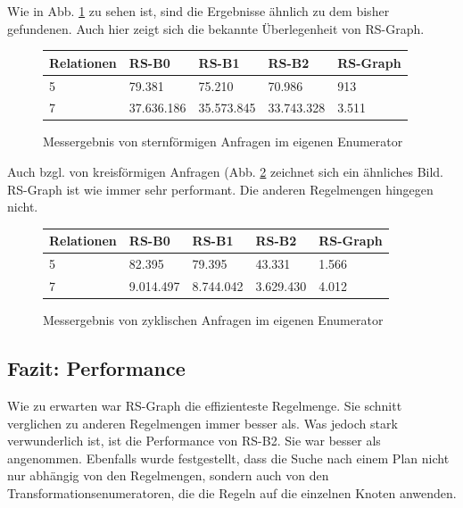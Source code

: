 Wie in Abb. \ref{starQuery123} zu sehen ist, sind die Ergebnisse ähnlich zu dem bisher gefundenen. Auch hier zeigt sich die bekannte Überlegenheit von RS-Graph. 


\begin{figure}[ht]
\centering
\begin{tabular}{|l|l|l|l|l|}
\hline
{\bf Relationen} & {\bf RS-B0} & {\bf RS-B1} & {\bf RS-B2} & {\bf RS-Graph} \\ \hline
5                & 79.381      & 75.210      & 70.986      & 913            \\ \hline
7                & 37.636.186  & 35.573.845  & 33.743.328  & 3.511          \\ \hline
\end{tabular}
  \caption{Messergebnis von sternförmigen Anfragen im eigenen Enumerator}
  \label{starQuery123}
\end{figure}


Auch bzgl. von kreisförmigen Anfragen (Abb. \ref{circle1} zeichnet sich ein ähnliches Bild. RS-Graph ist wie immer sehr performant. Die anderen Regelmengen hingegen nicht.



\begin{figure}[ht]
\centering
\begin{tabular}{|l|l|l|l|l|}
\hline
{\bf Relationen} & {\bf RS-B0} & {\bf RS-B1} & {\bf RS-B2} & {\bf RS-Graph} \\ \hline
5                & 82.395      & 79.395      & 43.331      & 1.566            \\ \hline
7                & 9.014.497  & 8.744.042  & 3.629.430  & 4.012          \\ \hline
\end{tabular}
  \caption{Messergebnis von zyklischen Anfragen im eigenen Enumerator}
  \label{circle1}
\end{figure}



\subsection{Fazit: Performance}

Wie zu erwarten war RS-Graph die effizienteste Regelmenge. Sie schnitt verglichen zu anderen Regelmengen immer besser als. Was jedoch stark verwunderlich ist, ist die Performance von RS-B2. Sie war besser als angenommen. Ebenfalls wurde festgestellt, dass die Suche nach einem Plan nicht nur abhängig von den Regelmengen, sondern auch von den Transformationsenumeratoren, die die Regeln auf die einzelnen Knoten anwenden.









